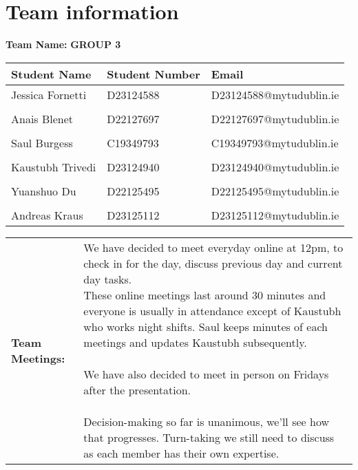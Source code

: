 \documentclass[a4paper,12pt]{article}
\begin{document}
\newpage
\section{Team information}
\textbf{Team Name:} \textbf{GROUP 3}
\vspace{0.2cm}
\begin{table}[h]
    \centering
    \begin{tabularx}{\textwidth}{@{}p{4cm} p{4cm} p{5cm}@{}}
        \toprule Student Name & Student Number & Email \\
        \midrule
            Jessica Fornetti & D23124588 & D23124588@mytudublin.ie \\ \\
            Anais Blenet & D22127697 & D22127697@mytudublin.ie \\ \\
            Saul Burgess & C19349793 & C19349793@mytudublin.ie \\ \\
            Kaustubh Trivedi & D23124940 & D23124940@mytudublin.ie \\ \\
            Yuanshuo Du & D22125495 & D22125495@mytudublin.ie \\ \\
            Andreas Kraus & D23125112 & D23125112@mytudublin.ie \\ 
        \bottomrule 
    \end{tabularx}
\end{table}

\begin{tabular}{|p{}|p{}|}
    \hline
    \textbf{Team Meetings:} & \parbox{0.65\textwidth}
    {\vspace{0.3cm}
    We have decided to meet everyday online at 12pm, to check in for the day, discuss previous day and current day tasks. \\ These online meetings last around 30 minutes and everyone is usually in attendance except of Kaustubh who works night shifts. Saul keeps minutes of each meetings and updates Kaustubh subsequently. \\ \\ We have also decided to meet in person on Fridays after the presentation. \\ \\ Decision-making so far is unanimous, we'll see how that progresses. Turn-taking we still need to discuss as each member has their own expertise. \vspace{0.3cm}} \\
    \hline
\end{tabular}
\end{document}
